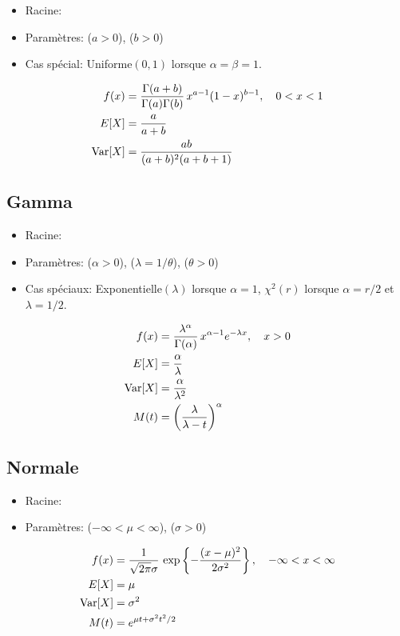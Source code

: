 \begin{itemize}
\item Racine: 
\item Paramètres:  ($a > 0$),
       ($b > 0$)
\end{itemize}
\begin{itemize}
\item Cas spécial: Uniforme$(0, 1)$ lorsque $\alpha = \beta = 1$.
\end{itemize}
\begin{align*}
  f(x)
  &= \frac{\Gamma(a + b)}{\Gamma(a) \Gamma(b)}\,
  x^{a - 1} (1 - x)^{b - 1}, \quad 0 < x < 1 \\
  E [ X ]
  &= \frac{a}{a + b} \\
  \operatorname{Var} [ X ]
  &= \frac{a b}{(a + b)^2 (a + b + 1)}
\end{align*}


\subsection{Gamma}
\label{distributions:gamma}

\begin{itemize}
\item Racine: 
\item Paramètres:  ($\alpha > 0$),
         ($\lambda = 1/\theta$),
        ($\theta > 0$)
\end{itemize}
\begin{itemize}
\item Cas spéciaux: Exponentielle$(\lambda)$ lorsque $\alpha = 1$,
  $\chi^2(r)$ lorsque $\alpha = r/2$ et $\lambda = 1/2$.
\end{itemize}
\begin{align*}
  f(x)
  &= \frac{\lambda^\alpha}{\Gamma(\alpha)}\, x^{\alpha - 1} e^{-\lambda x},
  \quad x > 0 \\
  E [ X ]
  &= \frac{\alpha}{\lambda} \\
  \operatorname{Var} [ X ]
  &= \frac{\alpha}{\lambda^2} \\
  M(t)
  &= \left( \frac{\lambda}{\lambda - t} \right)^\alpha
\end{align*}


\subsection{Normale}
\label{distributions:normale}
\begin{itemize}
\item Racine: 
\item Paramètres:  ($-\infty < \mu < \infty$), 
  ($\sigma > 0$)
\end{itemize}
\begin{align*}
  f(x)
  &= \frac{1}{\sqrt{2\pi} \sigma}\,
  \exp\left\{ -\frac{(x - \mu)^2}{2\sigma^2} \right\}, \quad
  -\infty < x < \infty \\
  E [ X ]
  &= \mu \\
  \operatorname{Var} [ X ]
  &= \sigma^2 \\
  M(t)
  &= e^{\mu t + \sigma^2 t^2/2}
\end{align*}

